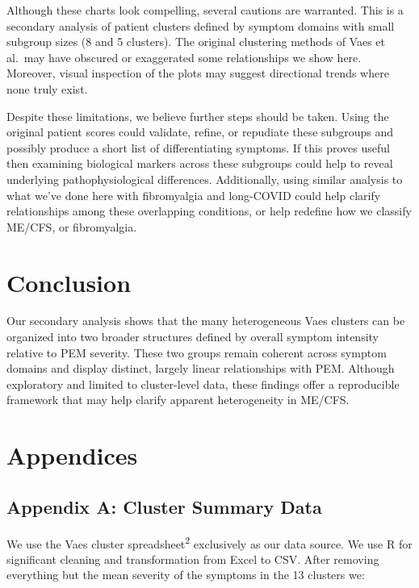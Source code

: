 \documentclass[
  letterpaper,
  DIV=11,
  numbers=noendperiod]{scrartcl}
\begin{document}
Although these charts look compelling, several cautions are warranted.
This is a secondary analysis of patient clusters defined by symptom
domains with small subgroup sizes (8 and 5 clusters). The original
clustering methods of Vaes et al.~may have obscured or exaggerated some
relationships we show here. Moreover, visual inspection of the plots may
suggest directional trends where none truly exist.

Despite these limitations, we believe further steps should be taken.
Using the original patient scores could validate, refine, or repudiate
these subgroups and possibly produce a short list of differentiating
symptoms. If this proves useful then examining biological markers across
these subgroups could help to reveal underlying pathophysiological
differences. Additionally, using similar analysis to what we've done
here with fibromyalgia and long-COVID could help clarify relationships
among these overlapping conditions, or help redefine how we classify
ME/CFS, or fibromyalgia.

\section{Conclusion}\label{conclusion}

Our secondary analysis shows that the many heterogeneous Vaes clusters
can be organized into two broader structures defined by overall symptom
intensity relative to PEM severity. These two groups remain coherent
across symptom domains and display distinct, largely linear
relationships with PEM. Although exploratory and limited to
cluster-level data, these findings offer a reproducible framework that
may help clarify apparent heterogeneity in ME/CFS.

\clearpage

\section{Appendices}\label{appendices}

\FloatBarrier

\subsection{Appendix A: Cluster Summary
Data}\label{appendix-a-cluster-summary-data}

We use the Vaes cluster spreadsheet\textsuperscript{2} exclusively as
our data source. We use R for significant cleaning and transformation
from Excel to CSV. After removing everything but the mean severity of
the symptoms in the 13 clusters we:
\end{document}
